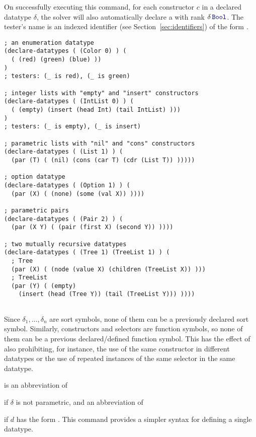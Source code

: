 \begin{description}
On successfully executing this command, 
for each constructor $c$ in a declared datatype $\delta$, 
the solver will also automatically declare a 
with rank $\delta\,\ter{Bool}$.
The tester's name is an indexed identifier (see Section~\ref{sec:identifiers}) 
of the form .
\medskip

\begin{lstlisting}[linewidth=37em]
; an enumeration datatype
(declare-datatypes ( (Color 0) ) (
  ( (red) (green) (blue) ))
)
; testers: (_ is red), (_ is green)

; integer lists with "empty" and "insert" constructors
(declare-datatypes ( (IntList 0) ) (
  ( (empty) (insert (head Int) (tail IntList) )))
)
; testers: (_ is empty), (_ is insert)

; parametric lists with "nil" and "cons" constructors
(declare-datatypes ( (List 1) ) (
  (par (T) ( (nil) (cons (car T) (cdr (List T)) )))))

; option datatype
(declare-datatypes ( (Option 1) ) (
  (par (X) ( (none) (some (val X)) ))))

; parametric pairs
(declare-datatypes ( (Pair 2) ) (
  (par (X Y) ( (pair (first X) (second Y)) ))))
  
; two mutually recursive datatypes
(declare-datatypes ( (Tree 1) (TreeList 1) ) (
  ; Tree
  (par (X) ( (node (value X) (children (TreeList X)) )))
  ; TreeList
  (par (Y) ( (empty) 
    (insert (head (Tree Y)) (tail (TreeList Y))) ))))
    
\end{lstlisting}

Since $\delta_1, \ldots, \delta_n$ are sort symbols, 
none of them can be a previously declared sort symbol.
Similarly, constructors and selectors are function symbols,
so none of them can be a previous declared/defined function symbol.
This has the effect of also prohibiting, for instance, the use 
of the same constructor in different datatypes or the use 
of repeated instances of the same selector in the same datatype.
\smallskip

%
\item[\expr{ 
(declare-datatype $\delta$ $d$)}] is an abbreviation of 
\begin{center}
\end{center}
if $\delta$ is not parametric, and an abbreviation of 
\begin{center}
\end{center}
if $d$ has the form .
This command provides a simpler syntax for defining a single datatype.


\end{description}
